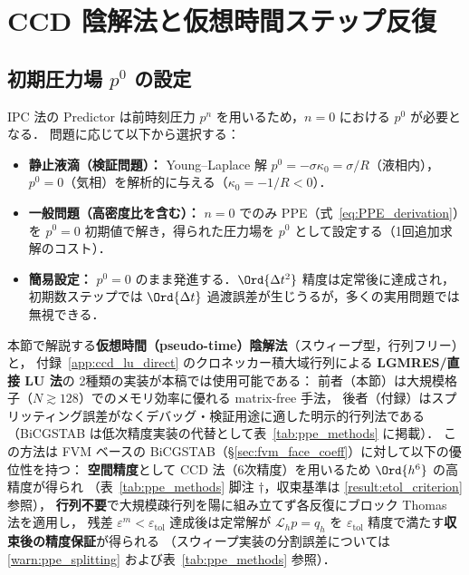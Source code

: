%
\section{CCD 陰解法と仮想時間ステップ反復}
\label{sec:ppe_pseudotime}

\subsection{初期圧力場 $p^0$ の設定}
\label{sec:ppe_p0_init}

IPC 法の Predictor は前時刻圧力 $p^n$ を用いるため，$n=0$ における $p^0$ が必要となる．
問題に応じて以下から選択する：
\begin{itemize}
  \item \textbf{静止液滴（検証問題）：} Young--Laplace 解 $p^0 = -\sigma\kappa_0 = \sigma/R$（液相内），$p^0 = 0$（気相）を解析的に与える（$\kappa_0 = -1/R < 0$）．
  \item \textbf{一般問題（高密度比を含む）：} $n=0$ でのみ PPE（式~\eqref{eq:PPE_derivation}）を $p^0 = 0$ 初期値で解き，得られた圧力場を $p^0$ として設定する（1回追加求解のコスト）．
  \item \textbf{簡易設定：} $p^0 = 0$ のまま発進する．$\Ord{\Delta t^2}$ 精度は定常後に達成され，初期数ステップでは $\Ord{\Delta t}$ 過渡誤差が生じうるが，多くの実用問題では無視できる．
\end{itemize}

\medskip
本節で解説する\textbf{仮想時間（pseudo-time）陰解法}（スウィープ型，行列フリー）と，
付録~\ref{app:ccd_lu_direct} のクロネッカー積大域行列による \textbf{LGMRES/直接 LU 法}の
2種類の実装が本稿では使用可能である：
前者（本節）は大規模格子（$N \gtrsim 128$）でのメモリ効率に優れる matrix-free 手法，
後者（付録）はスプリッティング誤差がなくデバッグ・検証用途に適した明示的行列法である
（BiCGSTAB は低次精度実装の代替として表~\ref{tab:ppe_methods} に掲載）．
この方法は FVM ベースの BiCGSTAB（§\ref{sec:fvm_face_coeff}）に対して以下の優位性を持つ：
\textbf{空間精度}として CCD 法（6次精度）を用いるため $\Ord{h^6}$ の高精度が得られ
（表~\ref{tab:ppe_methods} 脚注 $\dagger$，収束基準は \ref{result:etol_criterion} 参照），
\textbf{行列不要}で大規模疎行列を陽に組み立てず各反復にブロック Thomas 法を適用し，
残差 $\varepsilon^m < \varepsilon_\text{tol}$ 達成後は定常解が $\mathcal{L}_h p = q_h$ を
$\varepsilon_\text{tol}$ 精度で満たす\textbf{収束後の精度保証}が得られる
（スウィープ実装の分割誤差については \ref{warn:ppe_splitting} および表~\ref{tab:ppe_methods} 参照）．

